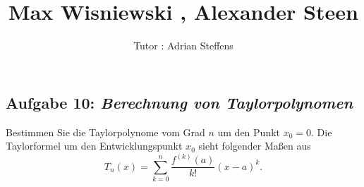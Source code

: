 \documentclass[11pt,a4paper,ngerman]{article}
\date{}
\title{Max Wisniewski , Alexander Steen}
\author{Tutor : Adrian Steffens}
\begin{document}

\maketitle
\thispagestyle{fancy}


\subsection*{Aufgabe 10: \mdseries\itshape Berechnung von Taylorpolynomen}

Bestimmen Sie die Taylorpolynome vom Grad $n$ um den Punkt $x_0 = 0$.
Die Taylorformel um den Entwicklungspunkt $x_0$ sieht folgender Maßen aus
$$
T_n(x) = \sum_{k=0}^{n} \frac{f^{(k)}(a)}{k!}(x-a)^k.
$$
\end{document}
